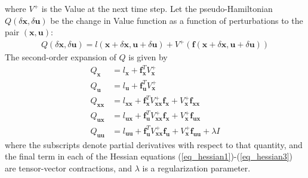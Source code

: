 \documentclass[journal ]{new-aiaa}
\newcommand{\state}{\ensuremath{\mathbf{x}}}
\newcommand{\control}{\ensuremath{\mathbf{u}}}
\begin{document}
where $V^+$ is the Value at the next time step.
Let the pseudo-Hamiltonian $Q(\delta\state,\delta\control)$ be the change in Value function as a function of perturbations to the pair $(\state,\control)$:
\begin{align}
Q(\delta\state,\delta\control) = l(\state+\delta\state,\control+\delta\control) + V^+(\mathbf{f}(\state+\delta\state,\control+\delta\control))
\end{align}
The second-order expansion of $ Q $ is given by
\begin{align}
Q_\state &= l_\state + \mathbf{f}_\state^T V^+_\state \\
Q_\control &= l_\control + \mathbf{f}_\control^T V^+_\state \\
Q_{\state\state} &= l_{\state\state} + \mathbf{f}_\state^T V^+_{\state\state}\mathbf{f}_\state + V^+_\state \mathbf{f}_{\state\state} \label{eq_hessian1}\\
Q_{\control\state} &= l_{\control\state} + \mathbf{f}_\control^T V^+_{\state\state}\mathbf{f}_\state + V^+_\state \mathbf{f}_{\control\state} \label{eq_hessian2}\\
Q_{\control\control} &= l_{\control\control} + \mathbf{f}_\control^T V^+_{\state\state}\mathbf{f}_\control + V^+_\state \mathbf{f}_{\control\control} +\lambda I \label{eq_hessian3}
\end{align}
where the subscripts denote partial derivatives with respect to that quantity, and the final term in each of the Hessian equations (\ref{eq_hessian1})-(\ref{eq_hessian3}) are tensor-vector contractions, and $ \lambda $ is a regularization parameter.  %
\end{document}
